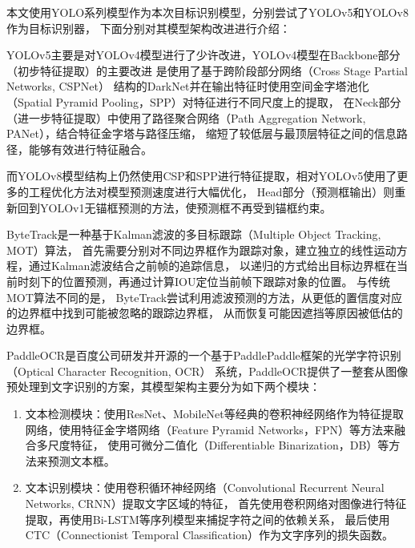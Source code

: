 
\label{chpt-3}
\label{sec-perceptron}
本文使用YOLO系列模型作为本次目标识别模型，分别尝试了YOLOv5和YOLOv8作为目标识别器，
下面分别对其模型架构改进进行介绍：

YOLOv5主要是对YOLOv4模型进行了少许改进，YOLOv4模型在Backbone部分（初步特征提取）的主要改进
是使用了基于跨阶段部分网络（Cross Stage Partial Networks, CSPNet）
结构的DarkNet并在输出特征时使用空间金字塔池化（Spatial Pyramid Pooling，SPP）对特征进行不同尺度上的提取，
在Neck部分（进一步特征提取）中使用了路径聚合网络（Path Aggregation Network, PANet），结合特征金字塔与路径压缩，
缩短了较低层与最顶层特征之间的信息路径，能够有效进行特征融合。

而YOLOv8模型结构上仍然使用CSP和SPP进行特征提取，相对YOLOv5使用了更多的工程优化方法对模型预测速度进行大幅优化，
Head部分（预测框输出）则重新回到YOLOv1无锚框预测的方法，使预测框不再受到锚框约束。

ByteTrack是一种基于Kalman滤波的多目标跟踪（Multiple Object Tracking, MOT）算法，
首先需要分别对不同边界框作为跟踪对象，建立独立的线性运动方程，通过Kalman滤波结合之前帧的追踪信息，
以递归的方式给出目标边界框在当前时刻下的位置预测，再通过计算IOU定位当前帧下跟踪对象的位置。
与传统MOT算法不同的是，
ByteTrack尝试利用滤波预测的方法，从更低的置信度对应的边界框中找到可能被忽略的跟踪边界框，
从而恢复可能因遮挡等原因被低估的边界框。

PaddleOCR是百度公司研发并开源的一个基于PaddlePaddle框架的光学字符识别（Optical Character Recognition, OCR）
系统，PaddleOCR提供了一整套从图像预处理到文字识别的方案，其模型架构主要分为如下两个模块：
\begin{enumerate}
  \item 文本检测模块：使用ResNet、MobileNet等经典的卷积神经网络作为特征提取网络，使用特征金字塔网络（Feature Pyramid Networks，FPN）等方法来融合多尺度特征，
  使用可微分二值化（Differentiable Binarization，DB）等方法来预测文本框。
  \item 文本识别模块：使用卷积循环神经网络（Convolutional Recurrent Neural Networks, CRNN）提取文字区域的特征，
  首先使用卷积网络对图像进行特征提取，再使用Bi-LSTM等序列模型来捕捉字符之间的依赖关系，
  最后使用CTC（Connectionist Temporal Classification）作为文字序列的损失函数。
\end{enumerate}

